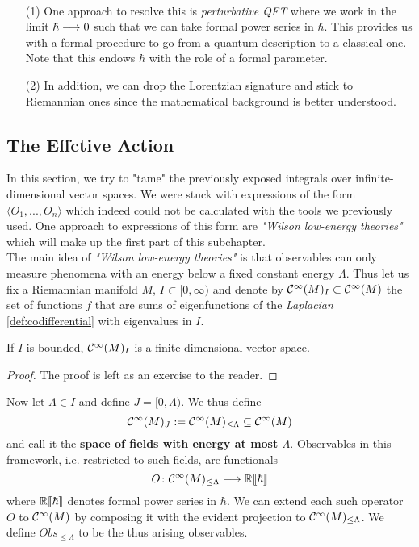\begin{rem}~
\begin{itemize}
  \item[(1)] One approach to resolve this is \emph{perturbative QFT} where we work in the limit $\hbar \longrightarrow 0$ such that we can take formal power series in $\hbar$. This provides us with a formal procedure to go from a quantum description to a classical one. Note that this endows $\hbar$ with the role of a formal parameter.

  \item[(2)] In addition, we can drop the Lorentzian signature and stick to Riemannian ones since the mathematical background is better understood.
\end{itemize}
\end{rem}


\subsection{The Effctive Action}
\label{subsec:effective_action}

In this section, we try to "tame" the previously exposed integrals over infinite-dimensional vector spaces. We were stuck with expressions of the form $\langle O_1, ..., O_n \rangle$ which indeed could not be calculated with the tools we previously used. One approach to expressions of this form are \emph{"Wilson low-energy theories"} which will make up the first part of this subchapter.\\

The main idea of \emph{"Wilson low-energy theories"} is that observables can only measure phenomena with an energy below a fixed constant energy $\Lambda$. Thus let us fix a Riemannian manifold $M$, $I \subset [0,\infty)$ and denote by $\mathcal{C}^{\infty}(M)_I \subset \mathcal{C}^{\infty}(M)$ the set of functions $f$ that are sums of eigenfunctions of the \emph{Laplacian} \ref{def:codifferential} with eigenvalues in $I$.

\begin{lem}
  If $I$ is bounded, $\mathcal{C}^{\infty}(M)_I$ is a finite-dimensional vector space.
\begin{proof}
  The proof is left as an exercise to the reader.
\end{proof}
\end{lem}

Now let $\Lambda \in I$ and define $J = [0,\Lambda)$. We thus define
$$ \mathcal{C}^{\infty}(M)_J := \mathcal{C}^{\infty}(M)_{\leq \Lambda} \subseteq \mathcal{C}^{\infty}(M) $$
and call it the \textbf{space of fields with energy at most $\Lambda$}. Observables in this framework, i.e. restricted to such fields, are functionals
$$ O \colon \mathcal{C}^{\infty}(M)_{\leq \Lambda} \longrightarrow \mathbb{R}\llbracket\hbar\rrbracket $$
where $\mathbb{R}\llbracket\hbar\rrbracket$ denotes formal power series in $\hbar$. We can extend each such operator $O$ to $\mathcal{C}^{\infty}(M)$ by composing it with the evident projection to $\mathcal{C}^{\infty}(M)_{\leq \Lambda}$. We define $Obs_{\leq \Lambda}$ to be the thus arising observables.\\

